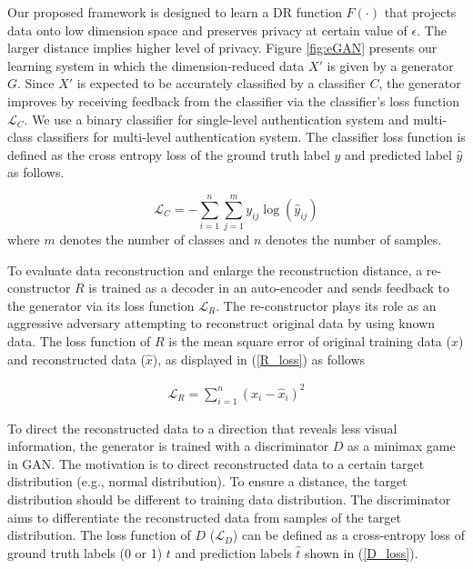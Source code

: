 Our proposed framework is designed to learn a DR function $F(\cdot)$ that projects data onto low dimension space and preserves privacy at certain value of $\epsilon$. The larger distance implies higher level of privacy. Figure \ref{fig:eGAN} presents our learning system in which the dimension-reduced data $X'$ is given by a generator $G$. Since $X'$ is expected to be accurately classified by a classifier $C$, the generator improves by receiving feedback from the classifier via the classifier's loss function $\mathcal{L}_C$. We use a binary classifier for single-level authentication system and multi-class classifiers for multi-level authentication system. The classifier loss function is defined as the cross entropy loss of the ground truth label $y$ and predicted label $\hat y$ as follows.

\begin{equation}
\mathcal{L}_C=-\sum_{i=1}^n\sum_{j=1}^m y_{ij} \log(\hat y_{ij})  
\label{C_loss}
\end{equation}
where $m$ denotes the number of classes and $n$ denotes the number of samples.

To evaluate data reconstruction and enlarge the reconstruction distance, a re-constructor $R$ is trained as a decoder in an auto-encoder and sends feedback to the generator via its loss function $\mathcal{L}_R$. The re-constructor plays its role as an aggressive adversary attempting to reconstruct original data by using known data. The loss function of $R$ is the mean square error of original training data ($x$) and reconstructed data ($\hat x$), as displayed in (\ref{R_loss}) as follows 

\begin{align}
\mathcal{L}_R = \sum_{i=1}^n{(x_i - \hat x_i)^2} 
\label{R_loss}
\end{align}   
 
To direct the reconstructed data to a direction that reveals less visual information, the generator is trained with a discriminator $D$ as a minimax game in GAN. The motivation is to direct reconstructed data to a certain target distribution (e.g., normal distribution). To ensure a distance, the target distribution should be different to training data distribution. The discriminator aims to differentiate the reconstructed data from samples of the target distribution. The loss function of $D$ ($\mathcal{L}_D$) can be defined as a cross-entropy loss of ground truth labels (0 or 1) $t$ and prediction labels $\hat t$ shown in (\ref{D_loss}).

